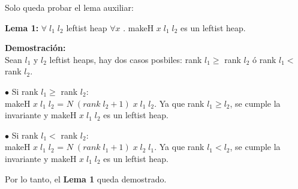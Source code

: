 \documentclass[11pt]{article}
\begin{document}
Solo queda probar el lema auxiliar:

\textbf{Lema 1:} $\forall \; l_1 \; l_2$ leftist heap $\forall x$ . makeH $x \; l_1 \; l_2$
es un leftist heap.

\textbf{Demostración:} \\
Sean $l_1$ y $l_2$ leftist heaps, hay dos casos posbiles: rank $l_1 \geq$
rank $l_2$ ó rank $l_1 <$ rank $l_2$.

$\bullet$ Si rank $l_1 \geq$ rank $l_2$: \\
makeH $x \; l_1 \; l_2$ = $ N \; (rank \;l_2+1) \; x \; l_1 \; l_2$. Ya que rank
$l_1 \geq l_2$, se cumple la invariante y makeH $x \; l_1 \; l_2$ es un
leftist heap. 

$\bullet$ Si rank $l_1 <$ rank $l_2$: \\
makeH $x \; l_1 \; l_2$ = $ N \; (rank \;l_1+1) \; x \; l_2 \; l_1$. Ya que rank
$l_1 < l_2$, se cumple la invariante y makeH $x \; l_1 \; l_2$ es un
leftist heap.

\begin{center}
  Por lo tanto, el \textbf{Lema 1} queda demostrado.
\end{center}
\end{document}
